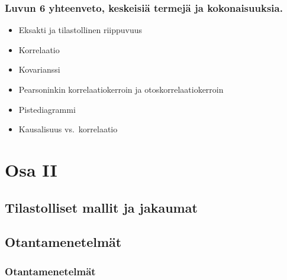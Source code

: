 \documentclass[
]{book}
\providecommand{\tightlist}{%
  \setlength{\itemsep}{0pt}\setlength{\parskip}{0pt}}
\begin{document}
\hypertarget{luvun-6-yhteenveto-keskeisiuxe4-termejuxe4-ja-kokonaisuuksia.}{%
\section{Luvun 6 yhteenveto, keskeisiä termejä ja kokonaisuuksia.}\label{luvun-6-yhteenveto-keskeisiuxe4-termejuxe4-ja-kokonaisuuksia.}}

\begin{itemize}
\tightlist
\item
  Eksakti ja tilastollinen riippuvuus
\item
  Korrelaatio
\item
  Kovarianssi
\item
  Pearsoninkin korrelaatiokerroin ja otoskorrelaatiokerroin
\item
  Pistediagrammi
\item
  Kausalisuus vs.~korrelaatio
\end{itemize}

\hypertarget{part-osa-ii}{%
\part{Osa II}\label{part-osa-ii}}

\hypertarget{luku7}{%
\chapter{Tilastolliset mallit ja jakaumat}\label{luku7}}

\hypertarget{luku8}{%
\chapter{Otantamenetelmät}\label{luku8}}

\hypertarget{alaluku81}{%
\section{Otantamenetelmät}\label{alaluku81}}
\end{document}
